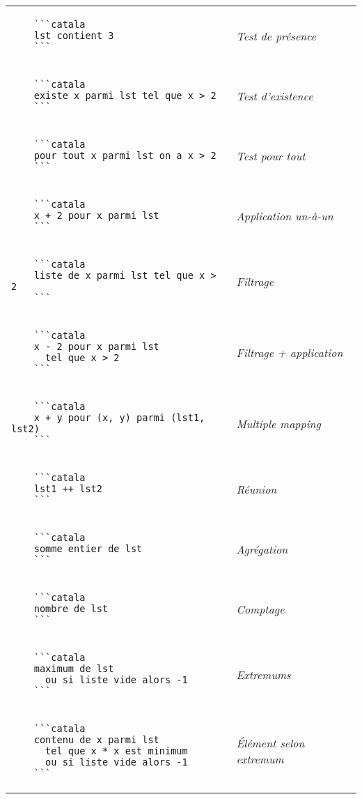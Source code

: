 \documentclass{article}
\makeatletter
\newenvironment{catala}{%
  \VerbatimEnvironment
  \let\FV@ListVSpace\relax
  \begin{verbatim}}%
 {\end{verbatim}}
\makeatother
\begin{document}
\begin{multicols}{3}
\begin{tabular}{@{}p{\cola}>{\slshape}p{\colb}@{}}
  \begin{catala}
    ```catala
    lst contient 3
    ```
  \end{catala}
  & Test de présence
  \\
  \begin{catala}
    ```catala
    existe x parmi lst tel que x > 2
    ```
  \end{catala}
  & Test d'existence
  \\
  \begin{catala}
    ```catala
    pour tout x parmi lst on a x > 2
    ```
  \end{catala}
  & Test pour tout
  \\
  \begin{catala}
    ```catala
    x + 2 pour x parmi lst
    ```
  \end{catala}
  & Application un-à-un
  \\
  \begin{catala}
    ```catala
    liste de x parmi lst tel que x > 2
    ```
  \end{catala}
  & Filtrage
  \\
  \begin{catala}
    ```catala
    x - 2 pour x parmi lst
      tel que x > 2
    ```
  \end{catala}
  & Filtrage + application
  \\
  \begin{catala}
    ```catala
    x + y pour (x, y) parmi (lst1, lst2)
    ```
  \end{catala}
  & Multiple mapping
  \\
  \begin{catala}
    ```catala
    lst1 ++ lst2
    ```
  \end{catala}
  & Réunion
  \\
  \begin{catala}
    ```catala
    somme entier de lst
    ```
  \end{catala}
  & Agrégation
  \\
  \begin{catala}
    ```catala
    nombre de lst
    ```
  \end{catala}
  & Comptage
  \\
  \begin{catala}
    ```catala
    maximum de lst
      ou si liste vide alors -1
    ```
  \end{catala}
  & Extremums
  \\
  \begin{catala}
    ```catala
    contenu de x parmi lst
      tel que x * x est minimum
      ou si liste vide alors -1
    ```
  \end{catala}
  & Élément selon extremum
  \\
\end{tabular}

\end{multicols}
\end{document}
